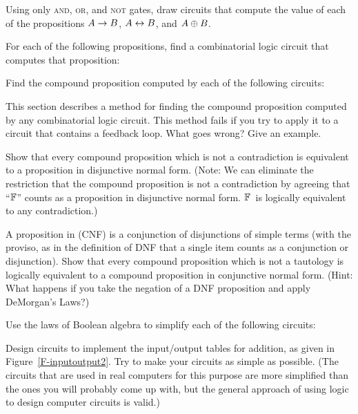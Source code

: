 \begin{exercises}

\problem Using only \textsc{and}, \textsc{or}, and \textsc{not} gates,
draw circuits that compute the value of each of the propositions
$A\rightarrow B$, $A\leftrightarrow B$, and $A\oplus B$.

\problem For each of the following propositions, find a combinatorial
logic circuit that computes that proposition:

\problem Find the compound proposition computed by each of the
following circuits:
\medskip

\centerline{\qquad{}}

\problem This section describes a method for finding the compound
proposition computed by any combinatorial logic circuit.  This method
fails if you try to apply it to a circuit that contains a feedback loop.
What goes wrong?  Give an example.

\problem Show that every compound proposition which is not a contradiction
is equivalent to a proposition in disjunctive normal form.  (Note: We can
eliminate the restriction that the compound proposition is not a
contradiction by agreeing that ``$\mathbb{F}$'' counts as a proposition in
disjunctive normal form.  $\mathbb{F}$~is logically equivalent to any contradiction.)

\problem A proposition in  (CNF) is
a conjunction of disjunctions of simple terms (with the proviso, as 
in the definition of DNF that a single item counts as a conjunction
or disjunction).  Show that every 
compound proposition which is not a tautology is logically equivalent
to a compound proposition in conjunctive normal form.  (Hint:
What happens if you take the negation of a DNF proposition and
apply DeMorgan's Laws?)

\problem Use the laws of Boolean algebra to simplify each of the
following circuits:
\medskip



\problem Design circuits to implement the input/output tables
for addition, as given in Figure~\ref{F-inputoutput2}.  Try to
make your circuits as simple as possible.  (The circuits that are
used in real computers for this purpose are more simplified than
the ones you will probably come up with, but the general approach
of using logic to design computer circuits is valid.)

\end{exercises}


